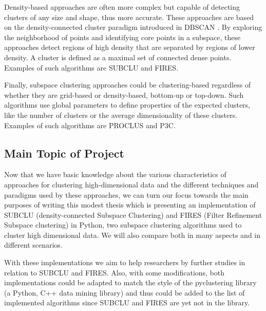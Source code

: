Density-based approaches are often more complex but capable of detecting clusters of any size and shape, thus more accurate. These approaches are based on the density-connected cluster paradigm introduced in DBSCAN \citep{10.5555/3001460.3001507}. By exploring the neighborhood of points and identifying core points in a subspace, these approaches detect regions of high density that are separated by regions of lower density. A cluster is defined as a maximal set of connected dense points. Examples of such algorithms are SUBCLU and FIRES.

Finally, subspace clustering approaches could be clustering-based regardless of whether they are grid-based or density-based, bottom-up or top-down. Such algorithms use global parameters to define properties of the expected clusters, like the number of clusters or the average dimensionality of these clusters. Examples of such algorithms are PROCLUS and P3C.

\subsection{Main Topic of Project} Now that we have basic knowledge about the various characteristics of approaches for clustering high-dimensional data and the different techniques and paradigms used by these approaches, we can turn our focus towards the main purposes of writing this modest thesis which is presenting an implementation of SUBCLU (density-connected Subspace Clustering) and FIRES (Filter Refinement Subspace clustering) in Python, two subspace clustering algorithms used to cluster high dimensional data. We will also compare both in many aspects and in different scenarios.

With these implementations we aim to help researchers by further studies in relation to SUBCLU and FIRES. Also, with some modifications, both implementations could be adapted to match the style of the pyclustering library (a Python, C++ data mining library) \citep{Novikov2019} and thus could be added to the list of implemented algorithms since SUBCLU and FIRES are yet not in the library.
